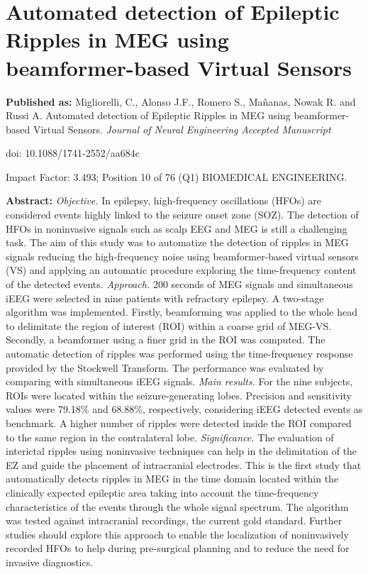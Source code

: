 \chapter[Automated detection of Epileptic ripples]{Automated detection of Epileptic Ripples in MEG using beamformer-based Virtual Sensors}
\label{ch:5}
\textbf{Published as:} 
Migliorelli, C., Alonso J.F., Romero S., Ma\~nanas, Nowak R. and Russi A.
Automated detection of Epileptic Ripples in MEG using beamformer-based Virtual Sensors. \textit{Journal of Neural Engineering} \textit{Accepted Manuscript}

doi: 10.1088/1741-2552/aa684c

Impact Factor: 3.493; Position 10 of 76 (Q1) BIOMEDICAL ENGINEERING.



\textbf{Abstract:} \textit{Objective.} In epilepsy, high-frequency oscillations (HFOs) are considered events highly linked to the seizure onset zone (SOZ). The detection of HFOs in noninvasive signals such as scalp EEG and MEG is still a challenging task. The aim of this study was to automatize the detection of ripples in MEG signals reducing the high-frequency noise using beamformer-based virtual sensors (VS) and applying an automatic procedure exploring the time-frequency content of the detected events. \textit{Approach.} 200 seconds of MEG signals and simultaneous iEEG were selected in nine patients with refractory epilepsy. A two-stage algorithm was implemented. Firstly, beamforming was applied to the whole head to delimitate the region of interest (ROI) within a coarse grid of MEG-VS. Secondly, a beamformer using a finer grid in the ROI was computed. The automatic detection of ripples was performed using the time-frequency response provided by the Stockwell Transform. The performance was evaluated by comparing with simultaneous iEEG signals. \textit{Main results.} For the nine subjects, ROIs were located within the seizure-generating lobes. Precision and sensitivity values were 79.18\% and 68.88\%, respectively, considering iEEG detected events as benchmark. A higher number of ripples were detected inside the ROI compared to the same region in the contralateral lobe. \textit{Significance.}  The evaluation of interictal ripples using noninvasive techniques can help in the delimitation of the EZ and guide the placement of intracranial electrodes. This is the first study that automatically detects ripples in MEG in the time domain located within the clinically expected epileptic area taking into account the time-frequency characteristics of the events through the whole signal spectrum. The algorithm was tested against intracranial recordings, the current gold standard. Further studies should explore this approach to enable the localization of noninvasively recorded HFOs to help during pre-surgical planning and to reduce the need for invasive diagnostics.

